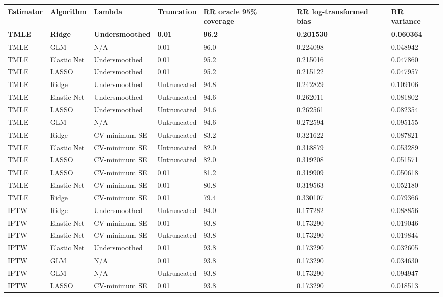 
\begin{longtable}[l]{lllllll}
\toprule
Estimator & Algorithm & Lambda & Truncation & RR oracle 95\% coverage & RR log-transformed bias & RR variance\\
\midrule
\textbf{TMLE} & \textbf{Ridge} & \textbf{Undersmoothed} & \textbf{0.01} & \textbf{96.2} & \textbf{0.201530} & \textbf{0.060364}\\
\midrule
\midrule
TMLE & GLM & N/A & 0.01 & 96.0 & 0.224098 & 0.048942\\
TMLE & Elastic Net & Undersmoothed & 0.01 & 95.2 & 0.215016 & 0.047860\\
TMLE & LASSO & Undersmoothed & 0.01 & 95.2 & 0.215122 & 0.047957\\
TMLE & Ridge & Undersmoothed & Untruncated & 94.8 & 0.242829 & 0.109106\\
TMLE & Elastic Net & Undersmoothed & Untruncated & 94.6 & 0.262011 & 0.081802\\
TMLE & LASSO & Undersmoothed & Untruncated & 94.6 & 0.262561 & 0.082354\\
TMLE & GLM & N/A & Untruncated & 94.6 & 0.272594 & 0.095155\\
TMLE & Ridge & CV-minimum SE & Untruncated & 83.2 & 0.321622 & 0.087821\\
TMLE & Elastic Net & CV-minimum SE & Untruncated & 82.0 & 0.318879 & 0.053289\\
TMLE & LASSO & CV-minimum SE & Untruncated & 82.0 & 0.319208 & 0.051571\\
TMLE & LASSO & CV-minimum SE & 0.01 & 81.2 & 0.319909 & 0.050618\\
TMLE & Elastic Net & CV-minimum SE & 0.01 & 80.8 & 0.319563 & 0.052180\\
TMLE & Ridge & CV-minimum SE & 0.01 & 79.4 & 0.330107 & 0.079366\\
IPTW & Ridge & Undersmoothed & Untruncated & 94.0 & 0.177282 & 0.088856\\
IPTW & Elastic Net & CV-minimum SE & 0.01 & 93.8 & 0.173290 & 0.019046\\
IPTW & Elastic Net & CV-minimum SE & Untruncated & 93.8 & 0.173290 & 0.019844\\
IPTW & Elastic Net & Undersmoothed & 0.01 & 93.8 & 0.173290 & 0.032605\\
IPTW & GLM & N/A & 0.01 & 93.8 & 0.173290 & 0.034630\\
IPTW & GLM & N/A & Untruncated & 93.8 & 0.173290 & 0.094947\\
IPTW & LASSO & CV-minimum SE & 0.01 & 93.8 & 0.173290 & 0.018513\\

\end{longtable}
